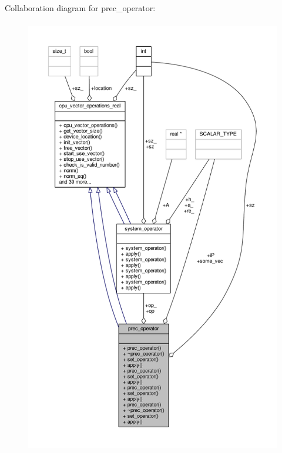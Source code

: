 Collaboration diagram for prec\-\_\-operator\-:
\nopagebreak
\begin{figure}[H]
\begin{center}
\leavevmode
\includegraphics[height=550pt]{structprec__operator__coll__graph}
\end{center}
\end{figure}
